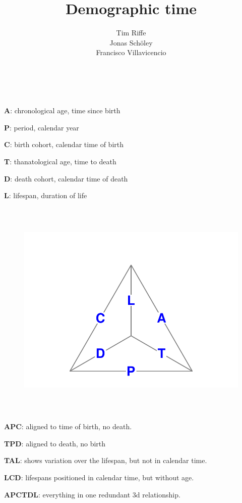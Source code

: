 \documentclass[20pt]{beamer}
\title{Demographic time}
\subtitle{Tim Riffe\\ Jonas Sch{\"o}ley\\
Francisco Villavicencio}
\begin{document}
\begin{frame}
	\titlepage
\end{frame}

\begin{frame}%
\frametitle{~}
  \begin{description}
    \item<1->{\textbf{A}:} chronological age, time since birth
    \item<2->{\textbf{P}:} period, calendar year
    \item<3->{\textbf{C}:} birth cohort, calendar time of birth
    \item<4->{\textbf{T}:} thanatological age, time to death
    \item<5->{\textbf{D}:} death cohort, calendar time of death
    \item<6->{\textbf{L}:} lifespan, duration of life
    \end{description}
\end{frame}

\begin{frame}
\frametitle{~}
\begin{figure}[b]
    \centering
    \includegraphics{Figures/Tetra1prg.pdf}
\end{figure} 
\end{frame}
\begin{frame}%
\frametitle{~}
  \begin{description}
    \item<1->{\textbf{APC}:} aligned to time of birth, no death.
    \item<2->{\textbf{TPD}:} aligned to death, no birth
    \item<3->{\textbf{TAL}:} shows variation over the lifespan, but not in
    calendar time.
    \item<4->{\textbf{LCD}:} lifespans positioned in calendar time, but without
    age.
    \item<5->{\textbf{APCTDL}:} everything in one redundant 3d relationship.
  \end{description}
\end{frame}
\end{document}
